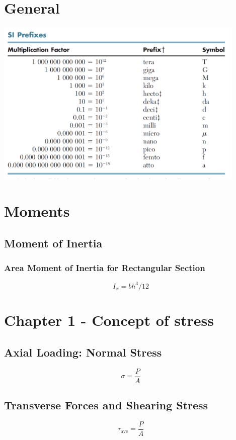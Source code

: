 \documentclass[10pt,landscape]{article}
\newenvironment{Figure}
     {\par\medskip\noindent\minipage{\linewidth}}
     {\endminipage\par\medskip}
\begin{document}
\begin{multicols}{3}
\section{General}
\begin{Figure}
    \centering
    \includegraphics[width=\linewidth, height=8cm]{SI_Prefix.png}
\end{Figure}

\section{Moments}
\subsection{Moment of Inertia}
\subsubsection{Area Moment of Inertia for Rectangular Section}
\begin{equation}
    I_x=bh^3/12
\end{equation}

\section{Chapter 1 - Concept of stress}
\subsection{Axial Loading: Normal Stress}
\begin{equation}
    \sigma=\frac{P}{A}
\end{equation}
\subsection{Transverse Forces and Shearing Stress}
\begin{equation}
    \tau_{\text{ave}}=\frac{P}{A}
\end{equation}

\end{multicols}
\end{document}

